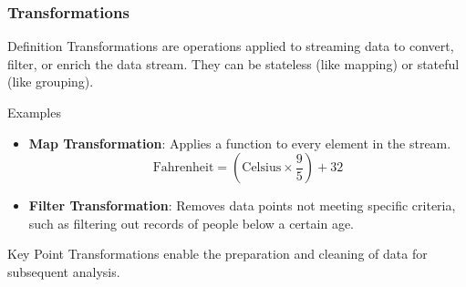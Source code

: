 \documentclass[aspectratio=169]{beamer}
\begin{document}
\begin{frame}[fragile]
    \frametitle{Transformations}
    \begin{block}{Definition}
        Transformations are operations applied to streaming data to convert, filter, or enrich the data stream. They can be stateless (like mapping) or stateful (like grouping).
    \end{block}
    \begin{block}{Examples}
        \begin{itemize}
            \item \textbf{Map Transformation}: Applies a function to every element in the stream.
                \begin{equation}
                \text{Fahrenheit} = \left(\text{Celsius} \times \frac{9}{5}\right) + 32
                \end{equation}
            \item \textbf{Filter Transformation}: Removes data points not meeting specific criteria, such as filtering out records of people below a certain age.
        \end{itemize}
    \end{block}
    \begin{block}{Key Point}
        Transformations enable the preparation and cleaning of data for subsequent analysis.
    \end{block}
\end{frame}
\end{document}
